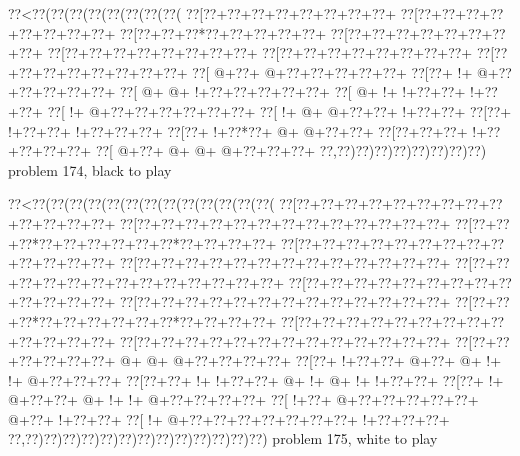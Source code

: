 \vbox{\vbox{\goo
\0??<\0??(\0??(\0??(\0??(\0??(\0??(\0??(\0??(
\0??[\0??+\0??+\0??+\0??+\0??+\0??+\0??+\0??+
\0??[\0??+\0??+\0??+\0??+\0??+\0??+\0??+\0??+
\0??[\0??+\0??+\0??*\0??+\0??+\0??+\0??+\0??+
\0??[\0??+\0??+\0??+\0??+\0??+\0??+\0??+\0??+
\0??[\0??+\0??+\0??+\0??+\0??+\0??+\0??+\0??+
\0??[\0??+\0??+\0??+\0??+\0??+\0??+\0??+\0??+
\0??[\0??+\0??+\0??+\0??+\0??+\0??+\0??+\0??+
\0??[\- @+\0??+\- @+\0??+\0??+\0??+\0??+\0??+
\0??[\0??+\- !+\- @+\0??+\0??+\0??+\0??+\0??+
\0??[\- @+\- @+\- !+\0??+\0??+\0??+\0??+\0??+
\0??[\- @+\- !+\- !+\0??+\0??+\- !+\0??+\0??+
\0??[\- !+\- @+\0??+\0??+\0??+\0??+\0??+\0??+
\0??[\- !+\- @+\- @+\0??+\0??+\- !+\0??+\0??+
\0??[\0??+\- !+\0??+\0??+\- !+\0??+\0??+\0??+
\0??[\0??+\- !+\0??*\0??+\- @+\- @+\0??+\0??+
\0??[\0??+\0??+\0??+\- !+\0??+\0??+\0??+\0??+
\0??[\- @+\0??+\- @+\- @+\- @+\0??+\0??+\0??+
\0??,\0??)\0??)\0??)\0??)\0??)\0??)\0??)\0??)
}
\hfil problem 174, black to play\hfil\break
}

\vbox{\vbox{\goo
\0??<\0??(\0??(\0??(\0??(\0??(\0??(\0??(\0??(\0??(\0??(\0??(\0??(\0??(
\0??[\0??+\0??+\0??+\0??+\0??+\0??+\0??+\0??+\0??+\0??+\0??+\0??+\0??+
\0??[\0??+\0??+\0??+\0??+\0??+\0??+\0??+\0??+\0??+\0??+\0??+\0??+\0??+
\0??[\0??+\0??+\0??*\0??+\0??+\0??+\0??+\0??+\0??*\0??+\0??+\0??+\0??+
\0??[\0??+\0??+\0??+\0??+\0??+\0??+\0??+\0??+\0??+\0??+\0??+\0??+\0??+
\0??[\0??+\0??+\0??+\0??+\0??+\0??+\0??+\0??+\0??+\0??+\0??+\0??+\0??+
\0??[\0??+\0??+\0??+\0??+\0??+\0??+\0??+\0??+\0??+\0??+\0??+\0??+\0??+
\0??[\0??+\0??+\0??+\0??+\0??+\0??+\0??+\0??+\0??+\0??+\0??+\0??+\0??+
\0??[\0??+\0??+\0??+\0??+\0??+\0??+\0??+\0??+\0??+\0??+\0??+\0??+\0??+
\0??[\0??+\0??+\0??*\0??+\0??+\0??+\0??+\0??+\0??*\0??+\0??+\0??+\0??+
\0??[\0??+\0??+\0??+\0??+\0??+\0??+\0??+\0??+\0??+\0??+\0??+\0??+\0??+
\0??[\0??+\0??+\0??+\0??+\0??+\0??+\0??+\0??+\0??+\0??+\0??+\0??+\0??+
\0??[\0??+\0??+\0??+\0??+\0??+\0??+\- @+\- @+\- @+\0??+\0??+\0??+\0??+
\0??[\0??+\- !+\0??+\0??+\- @+\0??+\- @+\- !+\- !+\- @+\0??+\0??+\0??+
\0??[\0??+\0??+\- !+\- !+\0??+\0??+\- @+\- !+\- @+\- !+\- !+\0??+\0??+
\0??[\0??+\- !+\- @+\0??+\0??+\- @+\- !+\- !+\- @+\0??+\0??+\0??+\0??+
\0??[\- !+\0??+\- @+\0??+\0??+\0??+\0??+\0??+\- @+\0??+\- !+\0??+\0??+
\0??[\- !+\- @+\0??+\0??+\0??+\0??+\0??+\0??+\0??+\- !+\0??+\0??+\0??+
\0??,\0??)\0??)\0??)\0??)\0??)\0??)\0??)\0??)\0??)\0??)\0??)\0??)\0??)
}
\hfil problem 175, white to play\hfil\break
}

